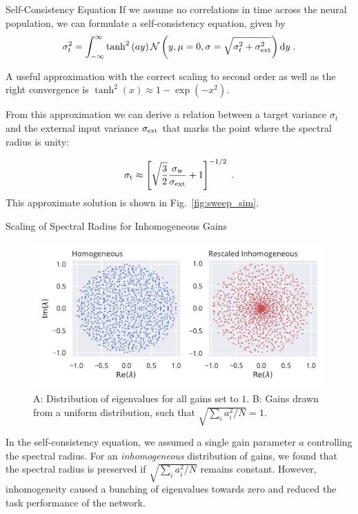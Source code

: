 \documentclass{beamer}
\begin{document}
\begin{frame}[t]
\begin{columns}[t]
\begin{column}{.4\textwidth}
\begin{myblock}{Self-Consistency Equation}
	If we assume no correlations in time across the neural population, we can formulate a self-consistency equation, given by
	\begin{equation*}
	\sigma^2_{t} = \int_{-\infty}^{\infty}  \tanh^2\left(ay\right) \mathcal{N}\left(y, \mu = 0, \sigma = \sqrt{\sigma^2_{t} + \sigma^2_{\rm ext}}\right)	\mathrm{d}y \;. 
	\end{equation*}
	
	A useful approximation with the correct scaling to second order as well as the right convergence is $\tanh^2(x) \approx 1 - \exp\left(-x^2 \right)$.
	
	From this approximation we can derive a relation between a target variance $\sigma_{t}$ and the external input variance $\sigma_{\rm ext}$ that marks the point where the spectral radius is unity:
	
	\begin{equation*}
	\sigma_{\rm t} \approx \left[\sqrt{\frac{3}{2}} \frac{\sigma_{\rm w}}{\sigma_{\rm ext}} +1\right]^{-1/2} \; .
	\end{equation*}
	This approximate solution is shown in Fig.~\ref{fig:sweep_sim}.
\end{myblock}

\begin{myblock}{Scaling of Spectral Radius for Inhomogeneous Gains}
	\vspace{-30pt}
	\begin{figure}
		\centering
		\includegraphics[width=\textwidth]{../figures/eigvals.pdf}
		\caption{A: Distribution of eigenvalues for all gains set to $1$. B: Gains drawn from a uniform distribution, such that $\sqrt{\sum_i a^2_i/N} = 1$.}		
	\end{figure}
	In the self-consistency equation, we assumed a single gain parameter $a$ controlling the spectral radius. For an \emph{inhomogeneous} distribution of gains, we found that the spectral radius is preserved if $\sqrt{\sum_i a^2_i/N}$ remains constant. However, inhomogeneity caused a bunching of eigenvalues towards zero and reduced the task performance of the network.
\end{myblock}


\end{column}
\end{columns}
\end{frame}
\end{document}
